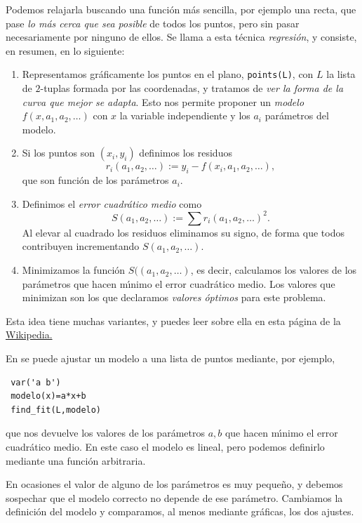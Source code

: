 Podemos relajarla buscando una funci\'on m\'as sencilla, por ejemplo una recta,
que pase {\itshape lo m\'as cerca que sea posible} de todos los puntos, pero
sin pasar necesariamente por ninguno de ellos. Se llama a esta t\'ecnica
{\itshape regresi\'on}, y consiste, en resumen, en lo siguiente:

\begin{enumerate}
 \item Representamos gr\'aficamente los puntos en el plano,
\lstinline|points(L)|, con $L$ la lista de $2$-tuplas formada por las
coordenadas, y tratamos de {\itshape ver la forma de la curva que mejor se
adapta}. Esto nos permite proponer un {\itshape modelo} $f(x,a_1,a_2,\dots)$ con
$x$ la variable independiente y los $a_i$ par\'ametros del modelo. 
\item Si los puntos son $(x_i,y_i)$ definimos los residuos
\[r_i(a_1,a_2,\dots):=y_i-f(x_i,a_1,a_2,\dots),\]
\noindent que son funci\'on de los par\'ametros $a_i$.
\item Definimos el {\itshape error cuadr\'atico medio} como 
\[S(a_1,a_2,\dots):=\sum r_i(a_1,a_2,\dots)^2.\]
Al elevar al cuadrado los residuos eliminamos su signo, de forma que todos
contribuyen incrementando $S(a_1,a_2,\dots).$
\item Minimizamos la funci\'on $S((a_1,a_2,\dots)$, es decir, calculamos los
valores de los par\'ametros que hacen m\'{\i}nimo el error cuadr\'atico medio.
Los valores que minimizan son los que declaramos {\itshape valores \'optimos}
para este problema. 
\end{enumerate}

Esta idea tiene muchas variantes, y puedes leer sobre ella en 
esta p\'agina de la 
\href{http://en.wikipedia.org/wiki/Non-linear_least_squares}{Wikipedia.}

En {\sage} se puede ajustar un modelo a una lista de puntos mediante, por
ejemplo,
\begin{lstlisting}
 var('a b')
 modelo(x)=a*x+b
 find_fit(L,modelo)
\end{lstlisting}
\noindent que nos devuelve los valores de los par\'ametros $a,b$ que hacen
m\'{\i}nimo el error cuadr\'atico medio. En este caso el modelo es lineal, pero
podemos definirlo mediante una funci\'on arbitraria.

En ocasiones el valor de alguno de los par\'ametros es muy peque\~no, y debemos
sospechar que el modelo correcto no depende de ese par\'ametro. Cambiamos la
definici\'on del modelo y comparamos, al menos mediante gr\'aficas, los dos
ajustes.


